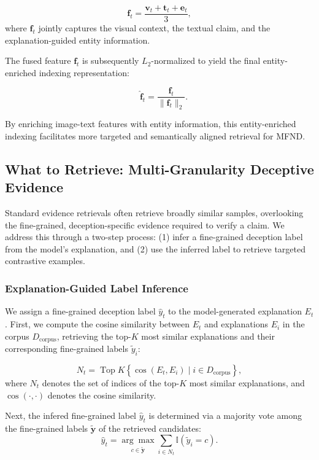 \begin{equation}
\mathbf{f}_t = \frac{ \mathbf{v}_t + \mathbf{t}_t + \mathbf{e}_t }{3} ,
\end{equation}
where $\mathbf{f}_t$ jointly captures the visual context, the textual claim, and the explanation-guided entity information. 

The fused feature $\mathbf{f}_t$ is subsequently $L_2$-normalized to yield the final entity-enriched indexing representation:

\begin{equation}\quad 
\hat{\mathbf{f}}_t = \frac{\mathbf{f}_t}{\|\mathbf{f}_t\|_2}.
\end{equation}

By enriching image-text features with entity information, this entity-enriched indexing facilitates more targeted and semantically aligned retrieval for MFND.

\subsection{What to Retrieve: Multi-Granularity Deceptive Evidence}
Standard evidence retrievals often retrieve broadly similar samples, overlooking the fine-grained, deception-specific evidence required to verify a claim.
We address this through a two-step process: 
(1) infer a fine-grained deception label from the model’s explanation, and (2) use the inferred label to retrieve targeted contrastive examples.


\subsubsection{Explanation-Guided Label Inference}
We assign a fine-grained deception label $\hat{y}_t$ to the model-generated explanation $E_t$.
First, we compute the cosine similarity between $E_t$ and  explanations $E_i$ in the corpus $D_{\text{corpus}}$, retrieving the top-$K$ most similar explanations and their corresponding fine-grained labels $\tilde{y}_i$:

\begin{equation}
N_t = \operatorname{Top}K \left\{ \cos(E_t, E_i) \mid i \in D_{\text{corpus}} \right\},
\end{equation}
where $N_t$ denotes the set of indices of the top-$K$ most similar explanations, and $\cos(\cdot, \cdot)$ denotes the cosine similarity.

Next, the infered fine-grained label $\hat{y}_t$ is determined via a majority vote among the fine-grained labels $\tilde{\mathbf{y}}$ of the retrieved candidates:
\begin{equation}
\hat{{y}}_t = \underset{c\in \mathbf{\tilde{y}}}{\arg\max} \sum_{i \in N_t} \mathbb{I}(\tilde{y}_i = c).
\end{equation}

